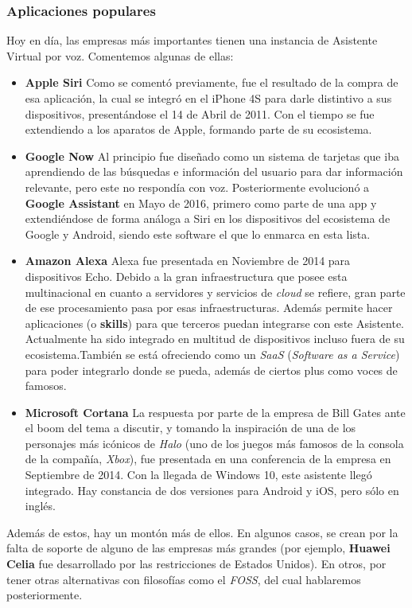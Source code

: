 \subsubsection {Aplicaciones populares}
Hoy en día, las empresas más importantes tienen una instancia de Asistente Virtual por voz. Comentemos algunas de ellas:

\begin{itemize}
	\item \textbf{Apple Siri} Como se comentó previamente, fue el resultado de la compra de esa aplicación, la cual se integró en el iPhone 4S para darle distintivo a sus dispositivos, presentándose el 14 de Abril de 2011. Con el tiempo se fue extendiendo a los aparatos de Apple, formando parte de su ecosistema.
	\item \textbf{Google Now} Al principio fue diseñado como un sistema de tarjetas que iba aprendiendo de las búsquedas e información del usuario para dar información relevante, pero este no respondía con voz. Posteriormente evolucionó a \textbf{Google Assistant} en Mayo de 2016, primero como parte de una app y extendiéndose de forma análoga a Siri en los dispositivos del ecosistema de Google y Android, siendo este software el que lo enmarca en esta lista.
	\item \textbf{Amazon Alexa} Alexa fue presentada en Noviembre de 2014 para dispositivos Echo. Debido a la gran infraestructura que posee esta multinacional en cuanto a servidores y servicios de \textit{cloud} se refiere, gran parte de ese procesamiento pasa por esas infraestructuras. Además permite hacer aplicaciones (o \textbf{skills}) para que terceros puedan integrarse con este Asistente. Actualmente ha sido integrado en multitud de dispositivos incluso fuera de su ecosistema.También se está ofreciendo como un \textit{SaaS} (\textit{Software as a Service}) para poder integrarlo donde se pueda, además de ciertos plus como voces de famosos.
	\item \textbf{Microsoft Cortana} La respuesta por parte de la empresa de Bill Gates ante el boom del tema a discutir, y tomando la inspiración de una de los personajes más icónicos de \textit{Halo} (uno de los juegos más famosos de la consola de la compañía, \textit{Xbox}), fue presentada en una conferencia de la empresa en Septiembre de 2014. Con la llegada de Windows 10, este asistente llegó integrado. Hay constancia de dos versiones para Android y iOS, pero sólo en inglés.
\end{itemize}

Además de estos, hay un montón más de ellos. En algunos casos, se crean por la falta de soporte de alguno de las empresas más grandes (por ejemplo, \textbf{Huawei Celia} fue desarrollado por las restricciones de Estados Unidos). En otros, por tener otras alternativas con filosofías como el \textit{FOSS}, del cual hablaremos posteriormente.


